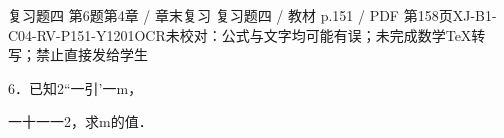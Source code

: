 \begin{bankitem}{复习题四 第6题}{第4章 / 章末复习 复习题四 / 教材 p.151 / PDF 第158页}{XJ-B1-C04-RV-P151-Y1201}{OCR未校对：公式与文字均可能有误；未完成数学TeX转写；禁止直接发给学生}
\begin{ocrdraft}
\par
6．已知2“一引'一m，
\par
一十一一2，求m的值．
\end{ocrdraft}
\end{bankitem}
